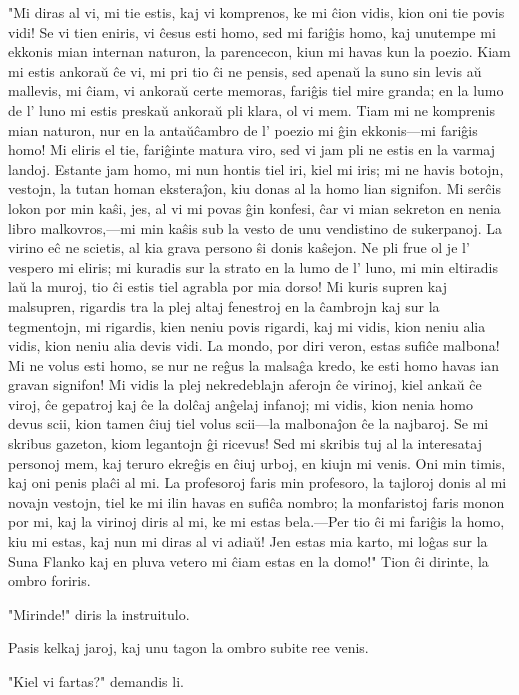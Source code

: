 "Mi diras al vi, mi tie estis, kaj vi komprenos, ke mi ĉion vidis, kion oni tie povis vidi! Se vi tien eniris, vi ĉesus esti homo, sed mi fariĝis homo, kaj unutempe mi ekkonis mian internan naturon, la parencecon, kiun mi havas kun la poezio. Kiam mi estis ankoraŭ ĉe vi, mi pri tio ĉi ne pensis, sed apenaŭ la suno sin levis aŭ mallevis, mi ĉiam, vi ankoraŭ certe memoras, fariĝis tiel mire granda; en la lumo de l' luno mi estis preskaŭ ankoraŭ pli klara, ol vi mem. Tiam mi ne komprenis mian naturon, nur en la antaŭĉambro de l' poezio mi ĝin ekkonis---mi fariĝis homo! Mi eliris el tie, fariĝinte matura viro, sed vi jam pli ne estis en la varmaj landoj. Estante jam homo, mi nun hontis tiel iri, kiel mi iris; mi ne havis botojn, vestojn, la tutan homan eksteraĵon, kiu donas al la homo lian signifon. Mi serĉis lokon por min kaŝi, jes, al vi mi povas ĝin konfesi, ĉar vi mian sekreton en nenia libro malkovros,---mi min kaŝis sub la vesto de unu vendistino de sukerpanoj. La virino eĉ ne scietis, al kia grava persono ŝi donis kaŝejon. Ne pli frue ol je l' vespero mi eliris; mi kuradis sur la strato en la lumo de l' luno, mi min eltiradis laŭ la muroj, tio ĉi estis tiel agrabla por mia dorso! Mi kuris supren kaj malsupren, rigardis tra la plej altaj fenestroj en la ĉambrojn kaj sur la tegmentojn, mi rigardis, kien neniu povis rigardi, kaj mi vidis, kion neniu alia vidis, kion neniu alia devis vidi. La mondo, por diri veron, estas sufiĉe malbona! Mi ne volus esti homo, se nur ne reĝus la malsaĝa kredo, ke esti homo havas ian gravan signifon! Mi vidis la plej nekredeblajn aferojn ĉe virinoj, kiel ankaŭ ĉe viroj, ĉe gepatroj kaj ĉe la dolĉaj anĝelaj infanoj; mi vidis, kion nenia homo devus scii, kion tamen ĉiuj tiel volus scii---la malbonaĵon ĉe la najbaroj. Se mi skribus gazeton, kiom legantojn ĝi ricevus! Sed mi skribis tuj al la interesataj personoj mem, kaj teruro ekreĝis en ĉiuj urboj, en kiujn mi venis. Oni min timis, kaj oni penis plaĉi al mi. La profesoroj faris min profesoro, la tajloroj donis al mi novajn vestojn, tiel ke mi ilin havas en sufiĉa nombro; la monfaristoj faris monon por mi, kaj la virinoj diris al mi, ke mi estas bela.---Per tio ĉi mi fariĝis la homo, kiu mi estas, kaj nun mi diras al vi adiaŭ! Jen estas mia karto, mi loĝas sur la Suna Flanko kaj en pluva vetero mi ĉiam estas en la domo!" Tion ĉi dirinte, la ombro foriris.

"Mirinde!" diris la instruitulo.

Pasis kelkaj jaroj, kaj unu tagon la ombro subite ree venis.

"Kiel vi fartas?" demandis li.

